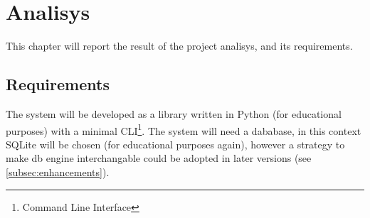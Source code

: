 

\section{Analisys}
This chapter will report the result of the project analisys, and its requirements.

\subsection{Requirements}
The system will be developed as a library written in Python (for educational purposes) with a minimal CLI\footnote{Command Line Interface}. The system will need a dababase, in this context SQLite will be chosen (for educational purposes again), however a strategy to make db engine interchangable could be adopted in later versions (see \ref{subsec:enhancements}).

